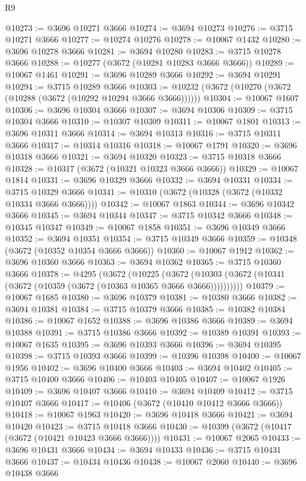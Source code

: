 \begin{lexlean}{R9}
\begin{coremodule}
@10273 := @3696 @10271 @3666
@10274 := @3694 @10273
@10276 := @3715 @10271 @3666
@10277 := @10274 @10276
@10278 := @10067 @1432
@10280 := @3696 @10278 @3666
@10281 := @3694 @10280
@10283 := @3715 @10278 @3666
@10288 := @10277 (@3672 (@10281 @10283 @3666 @3666))
@10289 := @10067 @1461
@10291 := @3696 @10289 @3666
@10292 := @3694 @10291
@10294 := @3715 @10289 @3666
@10303 := @10232 (@3672 (@10270 (@3672 (@10288 (@3672 (@10292 @10294 @3666 @3666))))))
@10304 := @10067 @1607
@10306 := @3696 @10304 @3666
@10307 := @3694 @10306
@10309 := @3715 @10304 @3666
@10310 := @10307 @10309
@10311 := @10067 @1801
@10313 := @3696 @10311 @3666
@10314 := @3694 @10313
@10316 := @3715 @10311 @3666
@10317 := @10314 @10316
@10318 := @10067 @1791
@10320 := @3696 @10318 @3666
@10321 := @3694 @10320
@10323 := @3715 @10318 @3666
@10328 := @10317 (@3672 (@10321 @10323 @3666 @3666))
@10329 := @10067 @1814
@10331 := @3696 @10329 @3666
@10332 := @3694 @10331
@10334 := @3715 @10329 @3666
@10341 := @10310 (@3672 (@10328 (@3672 (@10332 @10334 @3666 @3666))))
@10342 := @10067 @1863
@10344 := @3696 @10342 @3666
@10345 := @3694 @10344
@10347 := @3715 @10342 @3666
@10348 := @10345 @10347
@10349 := @10067 @1858
@10351 := @3696 @10349 @3666
@10352 := @3694 @10351
@10354 := @3715 @10349 @3666
@10359 := @10348 (@3672 (@10352 @10354 @3666 @3666))
@10360 := @10067 @1912
@10362 := @3696 @10360 @3666
@10363 := @3694 @10362
@10365 := @3715 @10360 @3666
@10378 := @4295
    (@3672
      (@10225
        (@3672 (@10303 (@3672 (@10341 (@3672 (@10359 (@3672 (@10363 @10365 @3666 @3666))))))))))
@10379 := @10067 @1685
@10380 := @3696 @10379
@10381 := @10380 @3666
@10382 := @3694 @10381
@10384 := @3715 @10379 @3666
@10385 := @10382 @10384
@10386 := @10067 @1652
@10388 := @3696 @10386 @3666
@10389 := @3694 @10388
@10391 := @3715 @10386 @3666
@10392 := @10389 @10391
@10393 := @10067 @1635
@10395 := @3696 @10393 @3666
@10396 := @3694 @10395
@10398 := @3715 @10393 @3666
@10399 := @10396 @10398
@10400 := @10067 @1956
@10402 := @3696 @10400 @3666
@10403 := @3694 @10402
@10405 := @3715 @10400 @3666
@10406 := @10403 @10405
@10407 := @10067 @1926
@10409 := @3696 @10407 @3666
@10410 := @3694 @10409
@10412 := @3715 @10407 @3666
@10417 := @10406 (@3672 (@10410 @10412 @3666 @3666))
@10418 := @10067 @1963
@10420 := @3696 @10418 @3666
@10421 := @3694 @10420
@10423 := @3715 @10418 @3666
@10430 := @10399 (@3672 (@10417 (@3672 (@10421 @10423 @3666 @3666))))
@10431 := @10067 @2065
@10433 := @3696 @10431 @3666
@10434 := @3694 @10433
@10436 := @3715 @10431 @3666
@10437 := @10434 @10436
@10438 := @10067 @2060
@10440 := @3696 @10438 @3666

\end{coremodule}
\end{lexlean}

